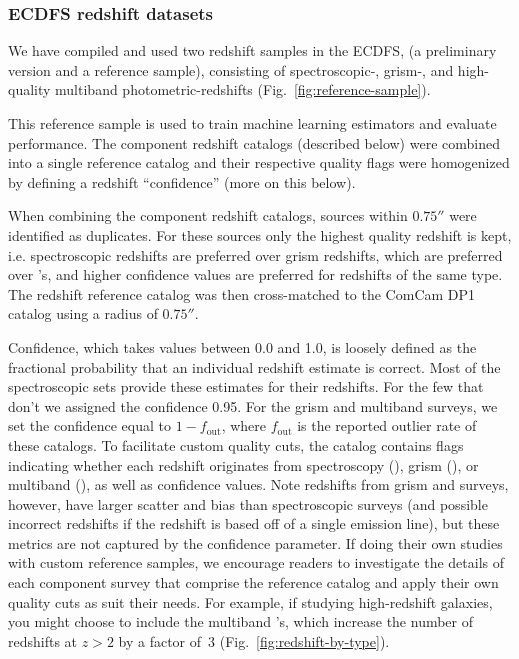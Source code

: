 \subsubsection{ECDFS redshift datasets}
\label{sec:data:prelim}

We have compiled and used two redshift samples in the ECDFS, (a preliminary version and a reference sample), consisting of spectroscopic-, grism-, and high-quality multiband photometric-redshifts (Fig.~\ref{fig:reference-sample}).   

This reference sample is used to train machine learning \photoz estimators and evaluate \photoz performance.
The component redshift catalogs (described below) were combined into a single reference catalog and their respective quality flags were homogenized by defining a redshift ``confidence'' (more on this below).

When combining the component redshift catalogs, sources within $0.75''$ were identified as duplicates.
For these sources only the highest quality redshift is kept, i.e. spectroscopic redshifts are preferred over grism redshifts, which are preferred over \photoz's, and higher confidence values are preferred for redshifts of the same type.
The redshift reference catalog was then cross-matched to the ComCam DP1 catalog using a radius of $0.75''$.

Confidence, which takes values between 0.0 and 1.0, is loosely defined as the fractional probability that an individual redshift estimate is correct.
Most of the spectroscopic sets provide these estimates for their redshifts.
For the few that don't we assigned the confidence 0.95.
For the grism and multiband \photoz surveys, we set the confidence equal to $1 - f_\text{out}$, where $f_\text{out}$ is the reported outlier rate of these catalogs.
To facilitate custom quality cuts, the catalog contains flags indicating whether each redshift originates from spectroscopy (), grism (), or multiband \photoz (), as well as confidence values.
Note redshifts from grism and \photoz surveys, however, have larger scatter and bias than spectroscopic surveys (and possible incorrect redshifts if the redshift is based off of a single emission line), but these metrics are not captured by the confidence parameter.
If doing their own studies with custom reference samples, we encourage readers to investigate the details of each component survey that comprise the reference catalog and apply their own quality cuts as suit their needs.
For example, if studying high-redshift galaxies, you might choose to include the multiband \photoz's, which increase the number of redshifts at $z > 2$ by a factor of~3 (Fig.~\ref{fig:redshift-by-type}).

